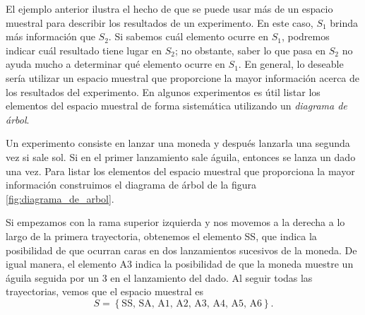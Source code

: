 El ejemplo anterior ilustra el hecho de que se puede usar más de un espacio muestral para describir los resultados de un experimento. En este caso, $S_1$ brinda más información que $S_2$. Si sabemos cuál elemento ocurre en $S_1$, podremos indicar cuál resultado tiene lugar en $S_2$; no obstante, saber lo que pasa en $S_2$ no ayuda mucho a determinar qué elemento ocurre en $S_1$. En general, lo deseable sería utilizar un espacio muestral que proporcione la mayor información acerca de los resultados del experimento. En algunos experimentos es útil listar los elementos del espacio muestral de forma sistemática utilizando un \emph{diagrama de árbol}.

\begin{examplebox}{}{}
    Un experimento consiste en lanzar una moneda y después lanzarla una segunda vez si sale sol. Si en el primer lanzamiento sale águila, entonces se lanza un dado una vez. Para listar los elementos del espacio muestral que proporciona la mayor información construimos el diagrama de árbol de la figura \ref{fig:diagrama_de_arbol}.
    \begin{center}
        \captionsetup*[figure]{hypcap=false}
        \label{fig:diagrama_de_arbol}
    \end{center}
    Si empezamos con la rama superior izquierda y nos movemos a la derecha a lo largo de la primera trayectoria, obtenemos el elemento SS, que indica la posibilidad de que ocurran caras en dos lanzamientos sucesivos de la moneda. De igual manera, el elemento A3 indica la posibilidad de que la moneda muestre un águila seguida por un 3 en el lanzamiento del dado. Al seguir todas las trayectorias, vemos que el espacio muestral es
    $$S = \left\{ \text{SS, SA, A1, A2, A3, A4, A5, A6} \right\} .$$
\end{examplebox}


